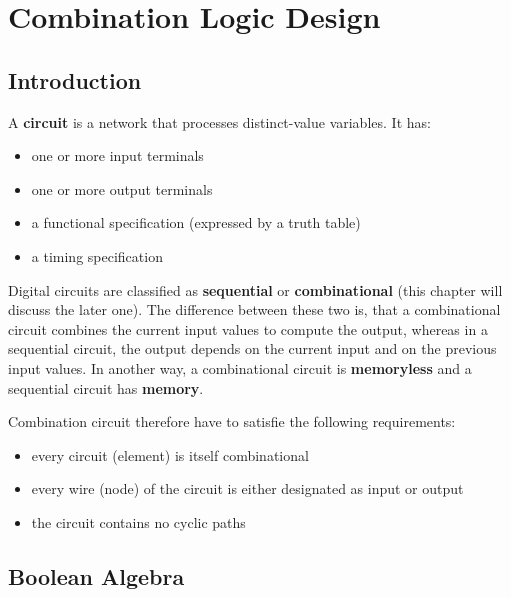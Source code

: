 \chapter{Combination Logic Design}

\section{Introduction}
A \textbf{circuit} is a network that processes distinct-value variables. It has:
\begin{itemize}
    \item one or more input terminals
    \item one or more output terminals
    \item a functional specification (expressed by a truth table)
    \item a timing specification
\end{itemize}
Digital circuits are classified as \textbf{sequential} or \textbf{combinational} (this chapter will discuss the later one). The difference
between these two is, that a combinational circuit combines the current input values to compute the output, whereas in a sequential circuit,
the output depends on the current input and on the previous input values. In another way, a combinational circuit is \textbf{memoryless} and 
a sequential circuit has \textbf{memory}.

Combination circuit therefore have to satisfie the following requirements:
\begin{itemize}
    \item every circuit (element) is itself combinational
    \item every wire (node) of the circuit is either designated as input or output
    \item the circuit contains no cyclic paths
\end{itemize}

\section{Boolean Algebra}

